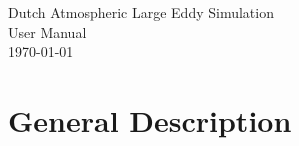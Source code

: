 \documentclass[a4paper]{book}
\begin{document}
\begin{titlepage}
\vspace*{7cm}
\begin{center}
{\Large Dutch Atmospheric Large Eddy Simulation}\\
\vspace*{1cm}
{\large User Manual}\\
\vspace*{0.5cm}
{\small \today}\\
\end{center}
\end{titlepage}
{}
\setcounter{tocdepth}{1}
\tableofcontents
{}
\chapter{General Description}




\end{document}
